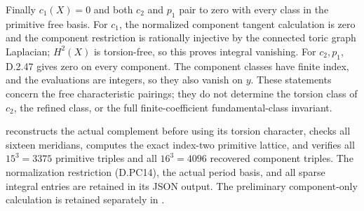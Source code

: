 Finally $c_1(X)=0$ and both $c_2$ and $p_1$ pair to zero with
every class in the primitive free basis. For $c_1$, the normalized
component tangent calculation is zero and the component restriction
is rationally injective by the connected toric graph Laplacian;
$H^2(X)$ is torsion-free, so this proves integral vanishing.
For $c_2,p_1$, D.2.47 gives zero on every component. The component
classes have finite index, and the evaluations are integers, so they
also vanish on $y$. These statements concern the free characteristic
pairings; they do not determine the torsion class of $c_2$, the
refined class, or the full finite-coefficient fundamental-class
invariant.

reconstructs the actual complement before using its torsion
character, checks all sixteen meridians, computes the exact
index-two primitive lattice, and verifies all $15^3=3375$ primitive
triples and all $16^3=4096$ recovered component triples. The
normalization restriction (D.PC14), the actual period basis, and
all sparse integral entries are retained in its JSON output.
The preliminary component-only calculation is retained separately
in .
